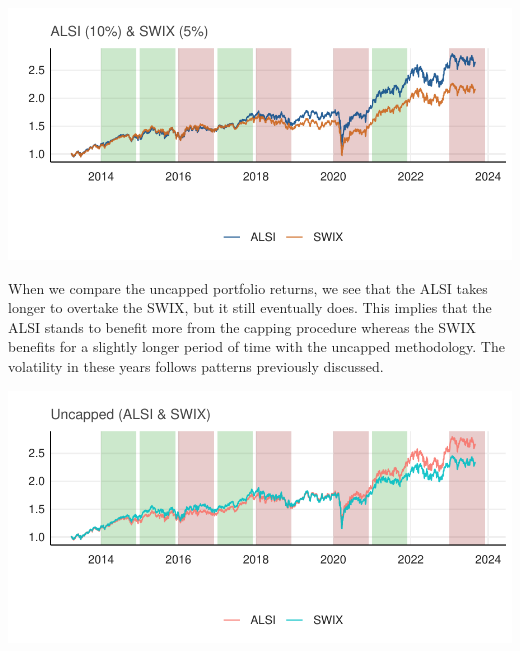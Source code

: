 \documentclass[11pt,preprint, authoryear]{elsarticle}
\let\origfigure\figure
\let\endorigfigure\endfigure
\renewenvironment{figure}[1][2] {
    \expandafter\origfigure\expandafter[H]
} {
    \endorigfigure
}
\numberwithin{equation}{section}
\numberwithin{figure}{section}
\numberwithin{table}{section}
\begin{document}
\begin{figure}[H]

{\centering \includegraphics{Question-3_files/figure-latex/unnamed-chunk-4-1} 

}

\caption{ \label{Figure3.4}}\label{fig:unnamed-chunk-4}
\end{figure}

When we compare the uncapped portfolio returns, we see that the ALSI
takes longer to overtake the SWIX, but it still eventually does. This
implies that the ALSI stands to benefit more from the capping procedure
whereas the SWIX benefits for a slightly longer period of time with the
uncapped methodology. The volatility in these years follows patterns
previously discussed.

\begin{figure}[H]

{\centering \includegraphics{Question-3_files/figure-latex/unnamed-chunk-5-1} 

}

\caption{ \label{Figure3.5}}\label{fig:unnamed-chunk-5}
\end{figure}


\end{document}
